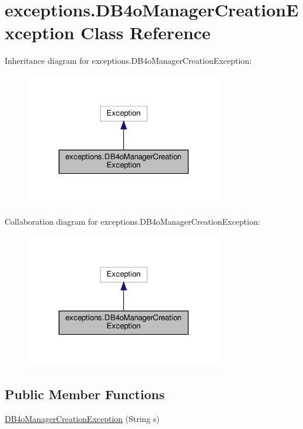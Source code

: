 \hypertarget{classexceptions_1_1_d_b4o_manager_creation_exception}{}\section{exceptions.\+D\+B4o\+Manager\+Creation\+Exception Class Reference}
\label{classexceptions_1_1_d_b4o_manager_creation_exception}


Inheritance diagram for exceptions.\+D\+B4o\+Manager\+Creation\+Exception\+:
\nopagebreak
\begin{figure}[H]
\begin{center}
\leavevmode
\includegraphics[width=246pt]{classexceptions_1_1_d_b4o_manager_creation_exception__inherit__graph}
\end{center}
\end{figure}


Collaboration diagram for exceptions.\+D\+B4o\+Manager\+Creation\+Exception\+:
\nopagebreak
\begin{figure}[H]
\begin{center}
\leavevmode
\includegraphics[width=246pt]{classexceptions_1_1_d_b4o_manager_creation_exception__coll__graph}
\end{center}
\end{figure}
\subsection*{Public Member Functions}
\begin{DoxyCompactItemize}
\item 
\mbox{\hyperlink{classexceptions_1_1_d_b4o_manager_creation_exception_a45281047a13292cbee85b6f04547adc5}{D\+B4o\+Manager\+Creation\+Exception}} (String s)
\end{DoxyCompactItemize}


